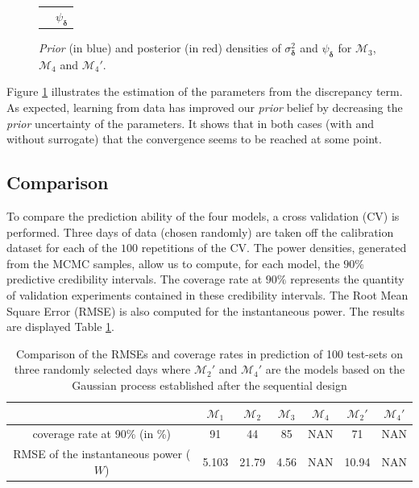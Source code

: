 \documentclass[soumission]{jsfds}
\begin{document}
\begin{figure}[htbp!]
\begin{center}
\begin{tabular}{cccc}
	&\multicolumn{3}{c}{$\psi_{\boldsymbol{\delta}}$}\\
  \end{tabular}   
\caption{\textit{Prior} (in blue) and posterior (in red) densities of $\sigma_{\boldsymbol{\delta}}^2$ and $\psi_{\boldsymbol{\delta}}$ for $\mathcal{M}_3$, $\mathcal{M}_4$ and $\mathcal{M}_4'$.}
\label{fig:comparisionDensities2}
\end{center}
\end{figure}

Figure \ref{fig:comparisionDensities2} illustrates the estimation of the parameters from the discrepancy term.
As expected, learning from data has improved our \textit{prior} belief by decreasing the \textit{prior} uncertainty of the parameters. 
It shows that in both cases (with and without surrogate) that the convergence seems to be reached at some point. \newline

\subsection{Comparison}

To compare the prediction ability of the four models,
a cross validation (CV) is performed.
Three days of data (chosen randomly) are taken off the calibration dataset for each of the $100$ repetitions of the CV. 
The power densities, generated from the MCMC samples, allow us to compute, for each model, the $90\%$ predictive credibility intervals. 
The coverage rate at $90\%$ represents the quantity of validation experiments contained in these credibility intervals.
The Root Mean Square Error (RMSE) is also computed for the instantaneous power. The results are displayed Table 
\ref{tab:comparison}.\newline

\begin{table}[htbp!]
\centering
\caption{Comparison of the RMSEs and coverage rates in prediction of 100 test-sets on three randomly selected days where $\mathcal{M}_2'$ and $\mathcal{M}_4'$ are the models based on the Gaussian process established after the sequential design}
\label{tab:comparison}
\begin{tabular}{c|c|c|c|c|c|c}

& $\mathcal{M}_1$ & $\mathcal{M}_2$ & $\mathcal{M}_3$ & $\mathcal{M}_4$ & $\mathcal{M}_2'$&  $\mathcal{M}_4'$ \\
\hline
\hline
coverage rate at 90\% (in \%) & 91 & 44 & 85 & NAN & 71 & NAN \\
\hline
RMSE of the instantaneous power ($W$) & 5.103 & 21.79 & 4.56 & NAN & 10.94 & NAN \\
\end{tabular}
\end{table}
\end{document}
